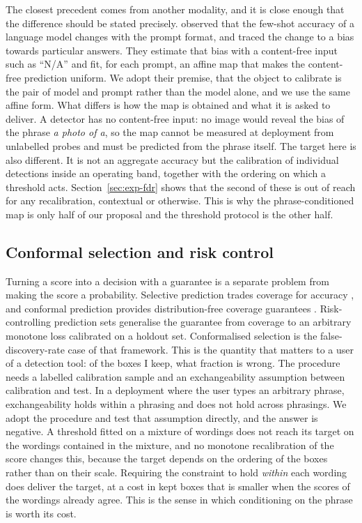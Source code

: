 The closest precedent comes from another modality, and it is close enough that the difference
should be stated precisely. \citet{zhao2021calibrate} observed that the few-shot accuracy of a
language model changes with the prompt format, and traced the change to a bias towards
particular answers. They estimate that bias with a content-free input such as ``N/A'' and fit,
for each prompt, an affine map that makes the content-free prediction uniform. We adopt their
premise, that the object to calibrate is the pair of model and prompt rather than the model
alone, and we use the same affine form. What differs is how the map is obtained and what it is
asked to deliver. A detector has no content-free input: no image would reveal the bias of the
phrase \emph{a photo of a}, so the map cannot be measured at deployment from unlabelled probes
and must be predicted from the phrase itself. The target here is also different. It is not an
aggregate accuracy but the calibration of individual detections inside an operating band,
together with the ordering on which a threshold acts. Section~\ref{sec:exp-fdr} shows that the
second of these is out of reach for any recalibration, contextual or otherwise. This is why
the phrase-conditioned map is only half of our proposal and the threshold protocol is the
other half.

\subsection{Conformal selection and risk control}

Turning a score into a decision with a guarantee is a separate problem from making the score a
probability. Selective prediction trades coverage for accuracy
\citep{geifman2017selective,geifman2019selectivenet}, and conformal prediction provides
distribution-free coverage guarantees \citep{angelopoulos2023conformal}. Risk-controlling
prediction sets \citep{bates2021distribution} generalise the guarantee from coverage to an
arbitrary monotone loss calibrated on a holdout set. Conformalised selection
\citep{jin2023selection} is the false-discovery-rate case of that framework. This is the
quantity that matters to a user of a detection tool: of the boxes I keep, what fraction is
wrong. The procedure needs a labelled calibration sample and an exchangeability assumption
between calibration and test. In a deployment where the user types an arbitrary phrase,
exchangeability holds within a phrasing and does not hold across phrasings. We adopt the
procedure and test that assumption directly, and the answer is negative. A threshold fitted on
a mixture of wordings does not reach its target on the wordings contained in the mixture, and
no monotone recalibration of the score changes this, because the target depends on the ordering
of the boxes rather than on their scale. Requiring the constraint to hold \emph{within} each
wording does deliver the target, at a cost in kept boxes that is smaller when the scores of the
wordings already agree. This is the sense in which conditioning on the phrase is worth its
cost.

